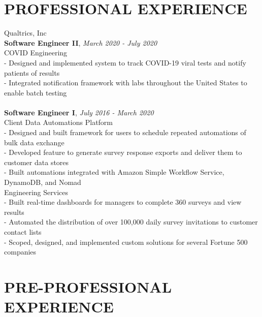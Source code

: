 \documentclass[margin,line]{res}
\begin{document}
\begin{resume}
\section{\bf PROFESSIONAL EXPERIENCE}
{\sc Qualtrics, Inc} \vspace{0.2cm} \\
{\bf Software Engineer II}, {\it March 2020 - July 2020} \vspace{0.1cm} \\
{\sc COVID Engineering} \\
- Designed and implemented system to track COVID-19 viral tests and notify patients of results \vspace{0.05cm} \\
- Integrated notification framework with labs throughout the United States to enable batch testing \vspace{0.05cm} \\
\vspace{0.1cm}
\dotfill \\
\vspace{0.1cm}
{\bf Software Engineer I}, {\it July 2016 - March 2020} \vspace{0.1cm} \\
{\sc Client Data Automations Platform} \\
- Designed and built framework for users to schedule repeated automations of bulk data exchange \vspace{0.05cm} \\
- Developed feature to generate survey response exports and deliver them to customer data stores \vspace{0.05cm} \\
- Built automations integrated with Amazon Simple Workflow Service, DynamoDB, and Nomad \vspace{0.2cm} \vspace{0.05cm} \\
{\sc Engineering Services} \vspace{0.05cm} \\
- Built real-time dashboards for managers to complete 360 surveys and view results \vspace{0.05cm} \\
- Automated the distribution of over 100,000 daily survey invitations to customer contact lists \vspace{0.05cm} \\
- Scoped, designed, and implemented custom solutions for several Fortune 500 companies

\section{PRE-PROFESSIONAL \\EXPERIENCE}


\end{resume}
\end{document}
